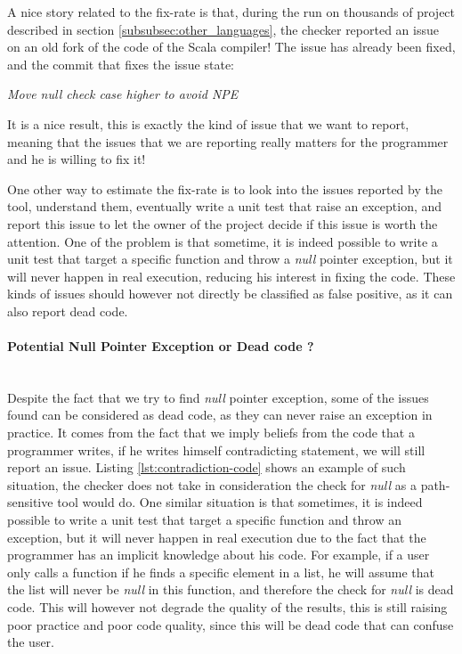 A nice story related to the fix-rate is that, during the run on thousands of project described in section \ref{subsubsec:other_languages}, the checker reported an issue on an old fork of the code of the Scala compiler! 
The issue has already been fixed, and the commit that fixes the issue state:

\begin{displayquote}
	\centering
	\textit{Move null check case higher to avoid NPE}
\end{displayquote}

It is a nice result, this is exactly the kind of issue that we want to report, meaning that the issues that we are reporting really matters for the programmer and he is willing to fix it!

One other way to estimate the fix-rate is to look into the issues reported by the tool, understand them, eventually write a unit test that raise an exception, and report this issue to let the owner of the project decide if this issue is worth the attention.
One of the problem is that sometime, it is indeed possible to write a unit test that target a specific function and throw a \emph{null} pointer exception, but it will never happen in real execution, reducing his interest in fixing the code.
These kinds of issues should however not directly be classified as false positive, as it can also report dead code.



\paragraph{Potential Null Pointer Exception or Dead code ?}\mbox{}\\
\label{subsubsec:dead_code}
Despite the fact that we try to find \emph{null} pointer exception, some of the issues found can be considered as dead code, as they can never raise an exception in practice.
It comes from the fact that we imply beliefs from the code that a programmer writes, if he writes himself contradicting statement, we will still report an issue.
Listing \ref{lst:contradiction-code} shows an example of such situation, the checker does not take in consideration the check for \emph{null} as a path-sensitive tool would do. \newline
One similar situation is that sometimes, it is indeed possible to write a unit test that target a specific function and throw an exception, but it will never happen in real execution due to the fact that the programmer has an implicit knowledge about his code. 
For example, if a user only calls a function if he finds a specific element in a list, he will assume that the list will never be \emph{null} in this function, and therefore the check for \emph{null} is dead code. 
This will however not degrade the quality of the results, this is still raising poor practice and poor code quality, since this will be dead code that can confuse the user.



